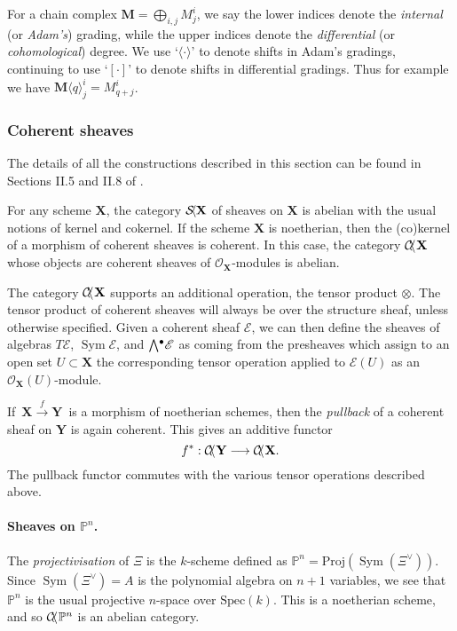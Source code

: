 \documentclass[a4paper]{article}
\theoremstyle{definition}
\theoremstyle{remark}
\newcommand{\Exter}{\mathchoice{{\textstyle\bigwedge}}%
    {{\bigwedge}}%
    {{\textstyle\wedge}}%
    {{\scriptstyle\wedge}}}
\DeclareMathOperator{\Sym}{\text{Sym}}
\newcommand{\Proj}{\ensuremath{\text{Proj}}}
\newcommand{\Pn}{\ensuremath{{\mathbb{P}^n}}}
\DeclareMathOperator{\coh}{\mathcal{C\kern -2pt o\kern -2pt h\kern -1pt}}
\DeclareMathOperator{\sh}{\mathcal{S\kern -2pt h\kern -2pt}}
\begin{document}
For a chain complex \(\mathbf{M}=\bigoplus_{i,j}M^i_j\), we say the lower
indices denote the \textit{internal} (or \textit{Adam's}) grading, while the
upper indices denote the \textit{differential} (or \textit{cohomological})
degree.  We use `\(\langle\cdot\rangle\)' to denote shifts in Adam's gradings,
continuing to use `\([\cdot]\)' to denote shifts in differential gradings.  Thus
for example we have \(\mathbf{M}\langle q \rangle^i_j = M^i_{q+j}\).

\subsubsection{Coherent sheaves}

The details of all the constructions described in this section can be found in
Sections II.5 and II.8 of .

For any scheme \(\mathbf{X}\), the category \(\sh\mathbf{X}\) of sheaves on
\(\mathbf{X}\) is abelian with the usual notions of kernel and cokernel.
If the scheme \(\mathbf{X}\) is noetherian, then the
(co)kernel of a morphism of coherent sheaves is coherent. In this case, the category
\(\coh\mathbf{X}\) whose objects are coherent sheaves of
\(\mathscr{O}_\mathbf{X}\)-modules is abelian. 

The category \(\coh\mathbf{X}\) supports an additional operation, the tensor
product \(\otimes\). The tensor product of coherent sheaves will always be over
the structure sheaf, unless otherwise specified. Given a coherent sheaf
\(\mathscr{E}\), we can then define the sheaves of algebras \(T\mathscr{E}\),
\(\Sym \mathscr{E}\), and \(\Exter^\bullet \mathscr{E}\) as coming from
the presheaves which assign to an open set \(U\subset \mathbf{X}\) the
corresponding tensor operation applied to \(\mathscr{E}(U)\) as an
\(\mathscr{O}_\mathbf{X}(U)\)-module.

If \(\,\mathbf{X}\xrightarrow{\;f\;} \mathbf{Y}\,\) is a morphism of noetherian
schemes, then the \textit{pullback} of a coherent sheaf on \(\mathbf{Y}\)
is again coherent. This gives an additive functor \[f^\ast:
\coh\mathbf{Y}\longrightarrow \coh\mathbf{X}.\] 
The pullback functor commutes with the various tensor operations described above.

\paragraph{Sheaves on \Pn.} The \textit{projectivisation} of \(\Xi\) is the
\(k\)-scheme defined as \(\Pn = \Proj(\Sym (\Xi^\vee))\). Since
\(\Sym(\Xi^\vee)=A\) is the polynomial algebra on \(n+1\) variables, we see that
\(\Pn\) is the usual projective \(n\)-space over \(\text{Spec}(k)\). This is a
noetherian scheme, and so \(\coh\Pn\) is an abelian category.
\end{document}
